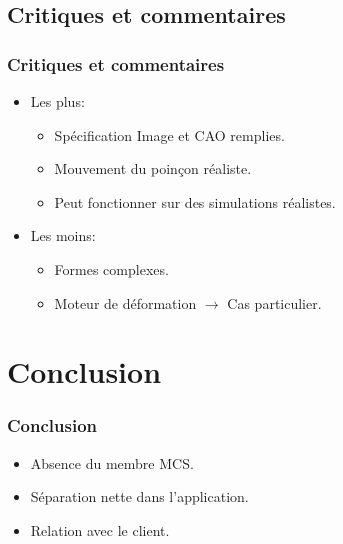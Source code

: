 \documentclass{beamer}
\begin{document}
\subsection{Critiques et commentaires}
\begin{frame}
    \frametitle{Critiques et commentaires}
    \begin{itemize}
        \item Les plus:
            \begin{itemize}
                \item Spécification Image et CAO remplies.
                \item Mouvement du poinçon réaliste.
                \item Peut fonctionner sur des simulations réalistes.
            \end{itemize}
        \item Les moins:
            \begin{itemize}
                \item Formes complexes.
                \item Moteur de déformation $\rightarrow$ Cas particulier.
            \end{itemize}
    \end{itemize}
\end{frame}

\section{Conclusion}
\begin{frame}
    \frametitle{Conclusion}
    \begin{itemize}
        \item Absence du membre MCS.
        \item Séparation nette dans l'application.
        \item Relation avec le client.
    \end{itemize}
\end{frame}
\end{document}
